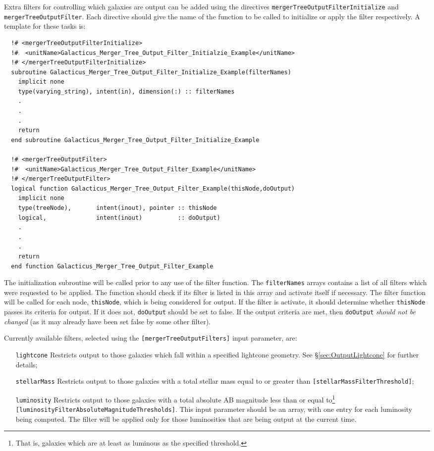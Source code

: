 Extra filters for controlling which galaxies are output can be added using the directives {\tt mergerTreeOutputFilterInitialize} and {\tt mergerTreeOutputFilter}. Each directive should give the name of the function to be called to initialize or apply the filter respectively. A template for these tasks is:
\begin{verbatim}
  !# <mergerTreeOutputFilterInitialize>
  !#  <unitName>Galacticus_Merger_Tree_Output_Filter_Initialzie_Example</unitName>
  !# </mergerTreeOutputFilterInitialize>
  subroutine Galacticus_Merger_Tree_Output_Filter_Initialize_Example(filterNames)
    implicit none
    type(varying_string), intent(in), dimension(:) :: filterNames
    .
    .
    .
    return
  end subroutine Galacticus_Merger_Tree_Output_Filter_Initialize_Example

  !# <mergerTreeOutputFilter>
  !#  <unitName>Galacticus_Merger_Tree_Output_Filter_Example</unitName>
  !# </mergerTreeOutputFilter>
  logical function Galacticus_Merger_Tree_Output_Filter_Example(thisNode,doOutput)
    implicit none
    type(treeNode),       intent(inout), pointer :: thisNode
    logical,              intent(inout)          :: doOutput)
    .
    .
    .
    return
  end function Galacticus_Merger_Tree_Output_Filter_Example
\end{verbatim}
The initialization subroutine will be called prior to any use of the filter function. The {\tt filterNames} arrays contains a list of all filters which were requested to be applied. The function should check if its filter is listed in this array and activate itself if necessary. The filter function will be called for each node, {\tt thisNode}, which is being considered for output. If the filter is activate, it should determine whether {\tt thisNode} passes its criteria for output. If it does not, {\tt doOutput} should be set to false. If the output criteria are met, then {\tt doOutput} \emph{should not be changed} (as it may already have been set false by some other filter).

Currently available filters, selected using the {\tt [mergerTreeOutputFilters]} input parameter, are:
\begin{itemize}
 \item [{\tt lightcone}] Restricts output to those galaxies which fall within a specified lightcone geometry. See \S\ref{sec:OutputLightcone} for further details;
 \item [{\tt stellarMass}] Restricts output to those galaxies with a total stellar mass equal to or greater than {\tt [stellarMassFilterThreshold]};
 \item [{\tt luminosity}] Restricts output to those galaxies with a total absolute AB magnitude less than or equal to\footnote{That is, galaxies which are at least as luminous as the specified threshold.} {\tt [luminosityFilterAbsoluteMagnitudeThresholds]}. This input parameter should be an array, with one entry for each luminosity being computed. The filter will be applied only for those luminosities that are being output at the current time.
\end{itemize}

